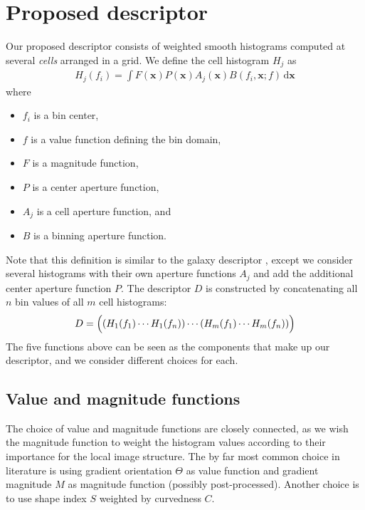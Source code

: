\documentclass[thesis.tex]{subfiles}
\def\x{\mathbf{x}}
\begin{document}
\chapter{Proposed descriptor}
%
Our proposed descriptor consists of weighted smooth histograms computed at several \textit{cells} arranged in a grid. We define the cell histogram $H_j$ as
%
\begin{align}
\label{eq:proposed_histogram}
H_j(f_i) = \int F(\x) P (\x) A_j (\x) B(f_i, \x; f) \,\text{d} \x
\end{align}
%
where
%
\begin{itemize}
\item[] $f_i$ is a bin center,
\item[] $f$ is a value function defining the bin domain,
\item[] $F$ is a magnitude function,
\item[] $P$ is a center aperture function,
\item[] $A_j$ is a cell aperture function, and
\item[] $B$ is a binning aperture function.
\end{itemize}
%
Note that this definition is similar to the galaxy descriptor \cite{pedersen2013shape}, except we consider several histograms with their own aperture functions $A_j$ and add the additional center aperture function $P$. The descriptor $D$ is constructed by concatenating all $n$ bin values of all $m$ cell histograms:
%
\begin{align}
\label{eq:proposed_descriptor}
D = \Bigl( \left(H_1(f_1) \cdots H_1(f_n)\right) \cdots (H_m(f_1) \cdots H_m(f_n)) \Bigr)
\end{align}
%
The five functions above can be seen as the components that make up our descriptor, and we consider different choices for each.
%
\section{Value and magnitude functions}
\label{sec:valueMagnitudeFunctions}
%
The choice of value and magnitude functions are closely connected, as we wish the magnitude function to weight the histogram values according to their importance for the local image structure. The by far most common choice in literature \cite{lowe2004distinctive,ke2004pca,mikolajczyk2005performance,tola2008fast} is using gradient orientation $\Theta$ as value function and gradient magnitude $M$ as magnitude function (possibly post-processed). Another choice \cite{pedersen2013shape} is to use shape index $S$ weighted by curvedness $C$.
\end{document}
